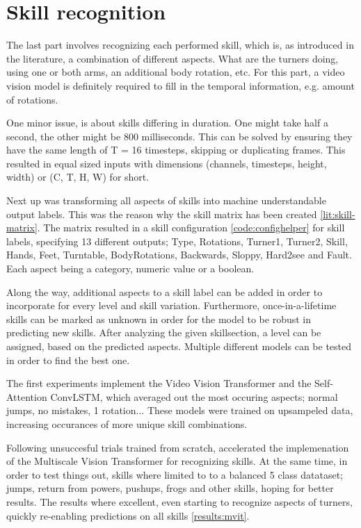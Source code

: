 \section{Skill recognition}
\label{methodology:skill-recognition}

The last part involves recognizing each performed skill, which is, as introduced in the literature, a combination of different aspects. What are the turners doing, using one or both arms, an additional body rotation, etc.
For this part, a video vision model is definitely required to fill in the temporal information, e.g. amount of rotations.

One minor issue, is about skills differing in duration. One might take half a second, the other might be 800 milliseconds.
This can be solved by ensuring they have the same length of T = 16 timesteps, skipping or duplicating frames. This resulted in equal sized inputs with dimensions (channels, timesteps, height, width) or (C, T, H, W) for short.

Next up was transforming all aspects of skills into machine understandable output labels. This was the reason why the skill matrix has been created \ref{lit:skill-matrix}. The matrix resulted in a skill configuration \ref{code:confighelper} for skill labels, specifying 13 different outputs; Type, Rotations, Turner1, Turner2, Skill, Hands, Feet, Turntable, BodyRotations, Backwards, Sloppy, Hard2see and Fault. Each aspect being a category, numeric value or a boolean.

Along the way, additional aspects to a skill label can be added in order to incorporate for every level and skill variation.
Furthermore, once-in-a-lifetime skills can be marked as unknown in order for the model to be robust in predicting new skills. After analyzing the given skillsection, a level can be assigned, based on the predicted aspects.
Multiple different models can be tested in order to find the best one.

The first experiments implement the Video Vision Transformer and the Self-Attention ConvLSTM, which averaged out the most occuring aspects; normal jumps, no mistakes, 1 rotation...
These models were trained on upsampeled data, increasing occurances of more unique skill combinations.

Following unsuccesful trials trained from scratch, accelerated the implemenation of the Multiscale Vision Transformer for recognizing skills. At the same time, in order to test things out, skills where limited to to a balanced 5 class datataset; jumps, return from powers, pushups, frogs and other skills, hoping for better results.
The results where excellent, even starting to recognize aspects of turners, quickly re-enabling predictions on all skills \ref{results:mvit}.

